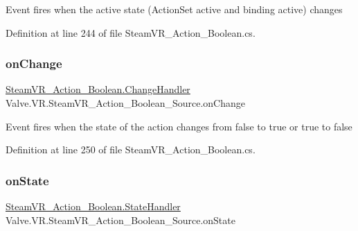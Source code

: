 Event fires when the active state (Action\+Set active and binding active) changes 



Definition at line 244 of file Steam\+V\+R\+\_\+\+Action\+\_\+\+Boolean.\+cs.

\mbox{\label{class_valve_1_1_v_r_1_1_steam_v_r___action___boolean___source_a3499c4f9a10e45562c36d84f2cd0f834}} 
\subsubsection{\texorpdfstring{onChange}{onChange}}
{\footnotesize\ttfamily \mbox{\hyperlink{class_valve_1_1_v_r_1_1_steam_v_r___action___boolean_a9dbdff089d05d822688005fa19fef120}{Steam\+V\+R\+\_\+\+Action\+\_\+\+Boolean.\+Change\+Handler}} Valve.\+V\+R.\+Steam\+V\+R\+\_\+\+Action\+\_\+\+Boolean\+\_\+\+Source.\+on\+Change}



Event fires when the state of the action changes from false to true or true to false 



Definition at line 250 of file Steam\+V\+R\+\_\+\+Action\+\_\+\+Boolean.\+cs.

\mbox{\label{class_valve_1_1_v_r_1_1_steam_v_r___action___boolean___source_a90421a54054f0660a28d0d6703bdbc7e}} 
\subsubsection{\texorpdfstring{onState}{onState}}
{\footnotesize\ttfamily \mbox{\hyperlink{class_valve_1_1_v_r_1_1_steam_v_r___action___boolean_a59bb3ba4454fcebc2f1d2ddd661dd38f}{Steam\+V\+R\+\_\+\+Action\+\_\+\+Boolean.\+State\+Handler}} Valve.\+V\+R.\+Steam\+V\+R\+\_\+\+Action\+\_\+\+Boolean\+\_\+\+Source.\+on\+State}



